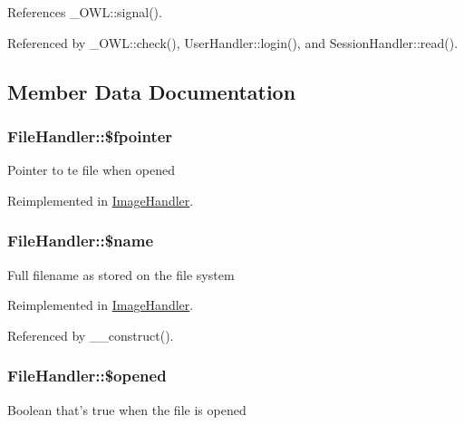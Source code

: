 References \_\-OWL::signal().



Referenced by \_\-OWL::check(), UserHandler::login(), and SessionHandler::read().



\subsection{Member Data Documentation}
\subsubsection[{\$fpointer}]{\setlength{\rightskip}{0pt plus 5cm}FileHandler::\$fpointer}\label{classFileHandler_aa0aa66fd3ad551b3f508b901a95c0c2d}
Pointer to te file when opened 

Reimplemented in \hyperlink{classImageHandler_ac56acda82f7ece75d33f6c57845a727e}{ImageHandler}.

\subsubsection[{\$name}]{\setlength{\rightskip}{0pt plus 5cm}FileHandler::\$name}\label{classFileHandler_a94903bd51b241928ed415ad271c38805}
Full filename as stored on the file system 

Reimplemented in \hyperlink{classImageHandler_a517b3d7ff8643cca1dc2080523bfe2d6}{ImageHandler}.



Referenced by \_\-\_\-construct().

\subsubsection[{\$opened}]{\setlength{\rightskip}{0pt plus 5cm}FileHandler::\$opened}\label{classFileHandler_a061409b2bbd2e13bc47415527c0de720}
Boolean that's true when the file is opened 

